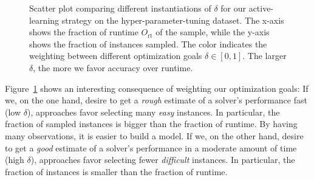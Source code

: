 \documentclass[runningheads]{llncs}
\begin{document}

\begin{figure}[tb!]
  \centering
  \caption{
    Scatter plot comparing different instantiations of $\delta$ for our active-learning strategy on the hyper-parameter-tuning dataset.
    The x-axis shows the fraction of runtime $O_{\operatorname{rt}}$ of the sample, while the y-axis shows the fraction of instances sampled.
    The color indicates the weighting between different optimization goals $\delta \in \left[0, 1\right]$.
    The larger $\delta$, the more we favor accuracy over runtime.
  }
  \label{fig:annitrainoptgoal}
\end{figure}

Figure~\ref{fig:annitrainoptgoal} shows an interesting consequence of weighting our optimization goals:
If we, on the one hand, desire to get a \emph{rough} estimate of a solver's performance fast (low $\delta$), approaches favor selecting many \emph{easy} instances.
In particular, the fraction of sampled instances is bigger than the fraction of runtime.
By having many observations, it is easier to build a model.
If we, on the other hand, desire to get a \emph{good} estimate of a solver's performance in a moderate amount of time (high $\delta$), approaches favor selecting fewer \emph{difficult} instances.
In particular, the fraction of instances is smaller than the fraction of runtime.
\end{document}
